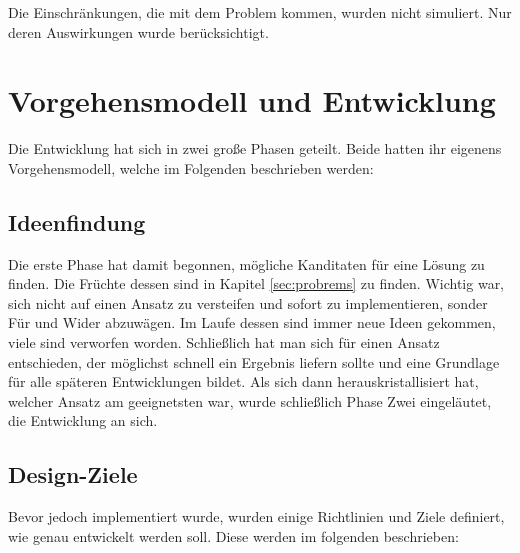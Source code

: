 \documentclass{article}
\begin{document}
Die Einschränkungen, die mit dem Problem kommen, wurden nicht simuliert. Nur deren
Auswirkungen wurde berücksichtigt. 

\clearpage
\section{Vorgehensmodell und Entwicklung}

Die Entwicklung hat sich in zwei große Phasen geteilt. Beide hatten ihr eigenens Vorgehensmodell,
welche im Folgenden beschrieben werden:

\subsection{Ideenfindung}

Die erste Phase hat damit begonnen, mögliche Kanditaten für eine Lösung zu finden. Die Früchte dessen
sind in Kapitel \ref{sec:probrems} zu finden. Wichtig war, sich nicht auf einen Ansatz zu versteifen und
sofort zu implementieren, sonder Für und Wider abzuwägen. Im Laufe dessen sind immer neue Ideen gekommen,
viele sind verworfen worden. Schließlich hat man sich für einen Ansatz entschieden, der möglichst schnell
ein Ergebnis liefern sollte und eine Grundlage für alle späteren Entwicklungen bildet. Als sich dann
herauskristallisiert hat, welcher Ansatz am geeignetsten war, wurde schließlich Phase Zwei eingeläutet,
die Entwicklung an sich.

\subsection{Design-Ziele}

Bevor jedoch implementiert wurde, wurden einige Richtlinien und Ziele definiert, wie genau entwickelt werden
soll. Diese werden im folgenden beschrieben:
\end{document}

